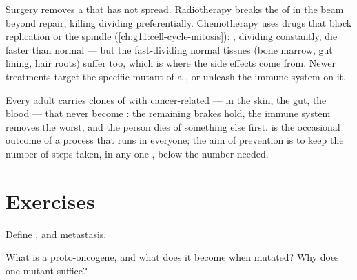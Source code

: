 \begin{example}\label{ex:g11:cancer:treatments}
Surgery removes a  that has not spread. Radiotherapy breaks the
 of  in the beam beyond repair, killing dividing 
preferentially. Chemotherapy uses drugs that block replication or the
spindle (\cref{ch:g11:cell-cycle-mitosis}):  , dividing
constantly, die faster than normal  --- but the fast-dividing
normal tissues (bone marrow, gut lining, hair roots) suffer too,
which is where the side effects come from. Newer treatments target
the specific mutant  of a , or unleash the immune system
on it.
\end{example}

\begin{remark}\label{rem:g11:cancer:everyone}
Every adult carries clones of  with cancer-related  ---
in the skin, the gut, the blood --- that never become : the
remaining brakes hold, the immune system removes the worst, and the
person dies of something else first.  is the occasional outcome
of a process that runs in everyone; the aim of prevention is to keep
the number of steps taken, in any one , below the number needed.
\end{remark}

\section{Exercises}

\begin{exercise}[$\star$]\label{exo:g11:cancer:1}
Define ,  and metastasis.
\end{exercise}

\begin{exercise}[$\star$]\label{exo:g11:cancer:2}
What is a proto-oncogene, and what does it become when mutated? Why
does one mutant  suffice?
\end{exercise}

